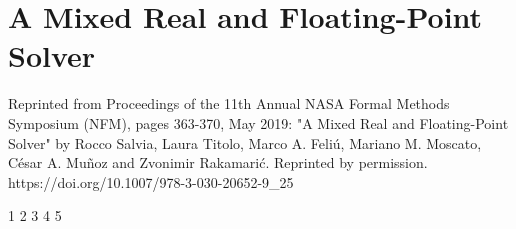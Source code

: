 
\chapter{A Mixed Real and Floating-Point Solver}
\label{sec:fprock}
Reprinted from Proceedings of the 11th Annual NASA Formal Methods Symposium (NFM), pages 363-370, May 2019: "A Mixed Real and Floating-Point Solver" by Rocco Salvia, Laura Titolo, Marco A. Feli\'{u}, Mariano M. Moscato, C\'{e}sar A. Mu\~{n}oz and Zvonimir Rakamari\'c. Reprinted by permission.\\
https://doi.org/10.1007/978-3-030-20652-9\_25


\setupuuchapterbib

                              		{1}
		{2}
       				{3}
                      					{4}
                              			{5}






%
%